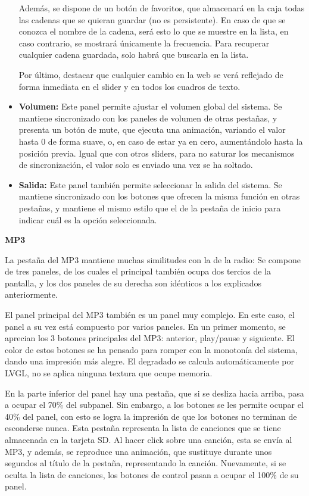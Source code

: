 \begin{itemize}
    Además, se dispone de un botón de favoritos, que almacenará en la caja todas las cadenas que se quieran guardar (no es persistente). En caso de que se conozca el nombre de la cadena, será esto lo que se muestre en la lista, en caso contrario, se mostrará únicamente la frecuencia. Para recuperar cualquier cadena guardada, solo habrá que buscarla en la lista.

    Por último, destacar que cualquier cambio en la web se verá reflejado de forma inmediata en el slider y en todos los cuadros de texto.
    \item \textbf{Volumen:} Este panel permite ajustar el volumen global del sistema. Se mantiene sincronizado con los paneles de volumen de otras pestañas, y presenta un botón de mute, que ejecuta una animación, variando el valor hasta 0 de forma suave, o, en caso de estar ya en cero, aumentándolo hasta la posición previa. Igual que con otros sliders, para no saturar los mecanismos de sincronización, el valor solo es enviado una vez se ha soltado.
    \item \textbf{Salida:} Este panel también permite seleccionar la salida del sistema. Se mantiene sincronizado con los botones que ofrecen la misma función en otras pestañas, y mantiene el mismo estilo que el de la pestaña de inicio para indicar cuál es la opción seleccionada.
\end{itemize}

\textbf{MP3}

La pestaña del MP3 mantiene muchas similitudes con la de la radio: Se compone de tres paneles, de los cuales el principal también ocupa dos tercios de la pantalla, y los dos paneles de su derecha son idénticos a los explicados anteriormente. 

El panel principal del MP3 también es un panel muy complejo. En este caso, el panel a su vez está compuesto por varios paneles. En un primer momento, se aprecian los 3 botones principales del MP3: anterior, play/pause y siguiente. El color de estos botones se ha pensado para romper con la monotonía del sistema, dando una impresión más alegre. El degradado se calcula automáticamente por LVGL, no se aplica ninguna textura que ocupe memoria.

En la parte inferior del panel hay una pestaña, que si se desliza hacia arriba, pasa a ocupar el 70\% del subpanel. Sin embargo, a los botones se les permite ocupar el 40\% del panel, con esto se logra la impresión de que los botones no terminan de esconderse nunca. Esta pestaña representa la lista de canciones que se tiene almacenada en la tarjeta SD. Al hacer click sobre una canción, esta se envía al MP3, y además, se reproduce una animación, que sustituye durante unos segundos al título de la pestaña, representando la canción. Nuevamente, si se oculta la lista de canciones, los botones de control pasan a ocupar el 100\% de su panel.

